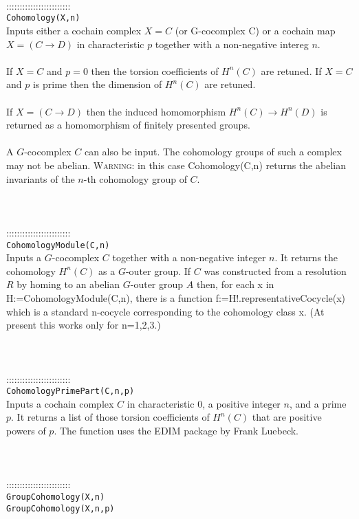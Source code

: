 \documentclass[a4paper,11pt]{report}
\begin{document}
{
 \\
 \\
 \\
 ::::::::::::::::::::::::\\
 \texttt{Cohomology(X,n) }\\
 

 Inputs either a cochain complex $X=C$ (or G-cocomplex C) or a cochain map $X=(C \longrightarrow D)$ in characteristic $p$ together with a non-negative intereg $n$. \\
 \\
If $X=C$ and $p=0$ then the torsion coefficients of $H^n(C)$ are retuned. If $X=C$ and $p$ is prime then the dimension of $H^n(C)$ are retuned. \\
 \\
If $X=(C \longrightarrow D)$ then the induced homomorphism $H^n(C)\longrightarrow H^n(D)$ is returned as a homomorphism of finitely presented groups. \\
 \\
 A $G$-cocomplex $C$ can also be input. The cohomology groups of such a complex may not be abelian. \textsc{Warning:} in this case Cohomology(C,n) returns the abelian invariants of the $n$-th cohomology group of $C$. \\
 \\
 \\
 \\
 ::::::::::::::::::::::::\\
 \texttt{CohomologyModule(C,n) }\\
 

 Inputs a $G$-cocomplex $C$ together with a non-negative integer $n$. It returns the cohomology $H^n(C)$ as a $G$-outer group. If $C$ was constructed from a resolution $R$ by homing to an abelian $G$-outer group $A$ then, for each x in H:=CohomologyModule(C,n), there is a function
f:=H!.representativeCocycle(x) which is a standard n-cocycle corresponding to
the cohomology class x. (At present this works only for n=1,2,3.) \\
 \\
 \\
 \\
 ::::::::::::::::::::::::\\
 \texttt{CohomologyPrimePart(C,n,p)}\\
 

 Inputs a cochain complex $C$ in characteristic 0, a positive integer $n$, and a prime $p$. It returns a list of those torsion coefficients of $H^n(C)$ that are positive powers of $p$. The function uses the EDIM package by Frank Luebeck. \\
 \\
 \\
 \\
 ::::::::::::::::::::::::\\
 \texttt{GroupCohomology(X,n) }\\
 \texttt{GroupCohomology(X,n,p)}\\
 

}
\end{document}
